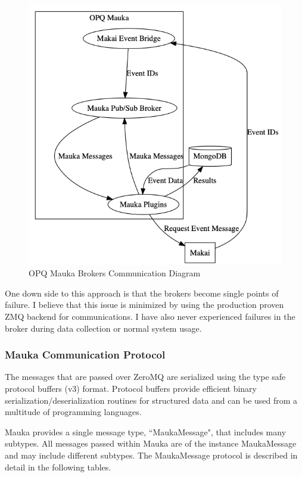\begin{figure}
	\centering
	\includegraphics[width=\linewidth]{figures/mauka_brokers_communication.png}
	\caption{OPQ Mauka Brokers Communication Diagram}
	\label{fig:mauka_brokers}
\end{figure}

One down side to this approach is that the brokers become single points of failure. I believe that this issue is minimized by using the production proven ZMQ backend for communications. I have also never experienced failures in the broker during data collection or normal system usage.

\subsubsection{Mauka Communication Protocol}
The messages that are passed over ZeroMQ are serialized using the type safe protocol buffers (v3) format. Protocol buffers provide efficient binary serialization/deserialization routines for structured data and can be used from a multitude of programming languages.

Mauka provides a single message type, ``MaukaMessage", that includes many subtypes. All messages passed within Mauka are of the instance MaukaMessage and may include different subtypes. The MaukaMessage protocol is described in detail in the following tables.

